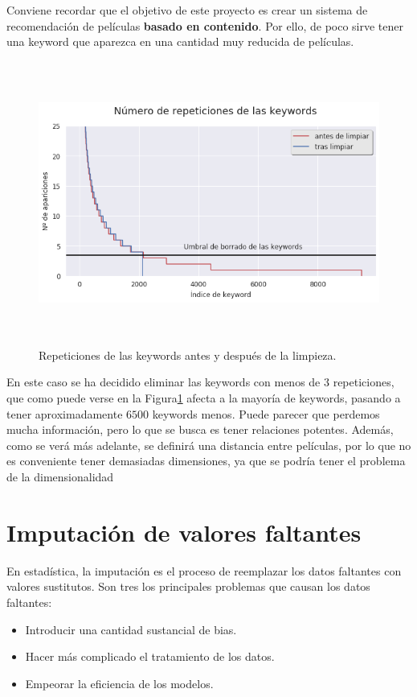 Conviene recordar que el objetivo de este proyecto es crear un sistema de recomendación de películas \textbf{basado en contenido}. Por ello, de poco sirve tener una keyword que aparezca en una cantidad muy reducida de películas.

\begin{figure}[H]
    \centering
    \captionsetup{width=12cm}
    \includegraphics[height=9.3cm]{./contenido/imagenes/keyword_cleaning.png}
\caption{Repeticiones de las keywords antes y después de la limpieza.}
\label{fig:key_cleaning}
\end{figure}

En este caso se ha decidido eliminar las keywords con menos de $3$ repeticiones, que como puede verse en la Figura\ref{fig:key_cleaning} afecta a la mayoría de keywords, pasando a tener aproximadamente $6500$ keywords menos. Puede parecer que perdemos mucha información, pero lo que se busca es tener relaciones potentes. Además, como se verá más adelante, se definirá una distancia entre películas, por lo que no es conveniente tener demasiadas dimensiones, ya que se podría tener el problema de la dimensionalidad \cite{wiki:CurseOfDimensionality}

\newpage
\section{Imputación de valores faltantes}

En estadística, la imputación es el proceso de reemplazar los datos faltantes con valores sustitutos. Son tres los principales problemas que causan los datos faltantes:
\begin{itemize}
    \item Introducir una cantidad sustancial de bias.
    \item Hacer más complicado el tratamiento de los datos.
    \item Empeorar la eficiencia de los modelos.
\end{itemize}

